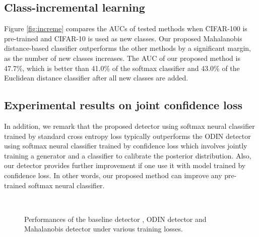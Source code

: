 \documentclass{article}
\begin{document}
\subsection{Class-incremental learning} \label{appendix:LIfddfOD}

Figure \ref{fig:increme} compares the AUCs of tested methods when CIFAR-100 is pre-trained and CIFAR-10 is used as new classes.
Our proposed Mahalanobis distance-based classifier outperforms the other methods by a significant margin, as the number of new classes increases.
The AUC of our proposed method is
47.7\%, which is better than
41.0\% of the softmax classifier and
43.0\% of the Euclidean distance classifier after all new classes are added.



\subsection{Experimental results on joint confidence loss} \label{sec:joint_conf_loss}


In addition, we remark that the proposed detector using softmax neural classifier trained by standard cross entropy loss typically outperforms the ODIN detector using softmax neural classifier trained by confidence loss \citep{lee2017confident} which involves jointly training a generator and a classifier to calibrate the posterior distribution. Also, our detector provides further improvement if one use it with model trained by confidence loss. In other words, our proposed method can improve any pre-trained softmax neural classifier.



\begin{figure*} [h] \centering
{} 
\vspace{-0.1in}
\,
\vspace{-0.1in}
\caption{
Performances of the baseline detector \citep{hendrycks2016baseline}, ODIN detector \citep{liang2017principled} and Mahalanobis detector under various training losses.}
\label{fignew}
\end{figure*}
\end{document}
